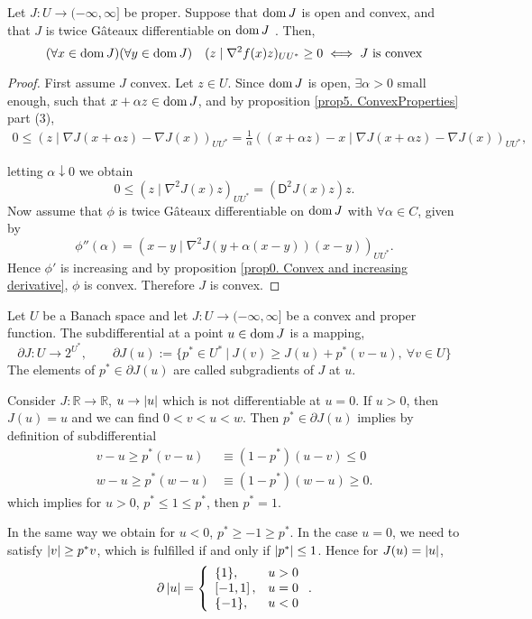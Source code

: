 \begin{theorem}
	\label{th5. Secon derivative convex.}
	 Let $J: U \rightarrow (-\infty, \infty]$ be proper. Suppose that $\mathrm{dom\,} J$
	 is open and convex, and that $J$ is twice G\^ateaux differentiable on $\mathrm{dom\,} J$ . Then,
	 \[
		 (\forall x \in \mathrm{dom\,} J )(\forall y \in \mathrm{dom\,} J ) \quad (z\mid  \nabla^2 f(x)z)_{UU^*} \geq 0 \iff J \text{ is convex}
	 \]
	 \begin{proof}
	 	First assume $J$ convex. Let $z \in U$. Since $\mathrm{dom\,} J$ is open, $\exists \alpha >0$ small enough, such that $x+\alpha z \in \mathrm{dom\,} J$, and by proposition \eqref{prop5. ConvexProperties} part (3), 
	 	\begin{align*}
	 		0 \leq	(z \mid \nabla J(x+\alpha z)-\nabla J(x))_{UU^*} = \frac{1}{\alpha} ((x+\alpha z) -x \mid \nabla J(x+\alpha z)-\nabla J(x))_{UU^*},
	 	\end{align*}
	 	
	 	letting $\alpha \downarrow 0$ we obtain
	 	\[
	 	0 \leq	(z \mid \nabla^2 J(x)z)_{UU^*} = (\mathsf{D}^2 J(x) z)z.
	 	\] 
	 	Now assume that $\phi$ is twice G\^ateaux differentiable on $\mathrm{dom\,} J$ with $\forall \alpha \in C$, given by
	 	\[
	 	 \phi''(\alpha) = (x-y \mid \nabla^2 J(y+\alpha(x-y))(x-y))_{UU^*}.
	 	\]
	 	Hence $\phi'$ is increasing and by proposition \eqref{prop0. Convex and increasing derivative}, $\phi$ is convex. Therefore $J$ is convex.
	 \end{proof}
\end{theorem}
\begin{definition}
	Let $U$ be a Banach space and let $J:U\rightarrow (-\infty, \infty]$ be a convex and proper function.
	The subdifferential at a point $u \in \mathrm{dom\,} J$ is a mapping,
	\[
		\partial J : U \rightarrow 2^{U^*}, \qquad \partial J(u):=\lbrace p^* \in U^* \ | \ J(v)\geq J(u)+p^*(v-u),
		\ \forall v \in U\rbrace
	\]
	The elements of $p^* \in \partial J(u)$ are called subgradients of $J$ at $u$.
\end{definition}
\begin{example}
	Consider $J:\mathbb{R}\rightarrow \mathbb{R}$, $u\rightarrow \left|u\right|$ which is not differentiable at $u=0$. If $u>0$, then $J(u)=u$ and we can find $0<v<u<w$. Then $p^* \in \partial J(u)$ implies by definition of subdifferential
	\begin{align*}
		v-u \geq p^*(v-u) &\equiv (1-p^*)(u-v) \leq 0 \\
		w-u \geq p^*(w-u) &\equiv (1-p^*)(w-u) \geq 0.
	\end{align*}
	which implies for $u>0$, $p^* \leq 1 \leq p^*$, then $p^*=1$.
	
	In the same way we obtain for $u<0$, $p^*\geq -1 \geq p^*$. 
	In the case $u=0$, we need to satisfy $\left|v\right|\geq p^*v$, which is fulfilled if and only if $\left|p^*\right|\leq 1$. Hence for $J(u)=\left|u\right|$,
	\begin{equation*}
	\partial \left|u\right|=
	\left\lbrace
		\begin{array}{lr}
		\{1\}, & u>0 \\
		\left[-1,1\right], & u=0 \\
		\{-1\}, & u < 0
		\end{array}
	\right. .
	\end{equation*}
\end{example}

